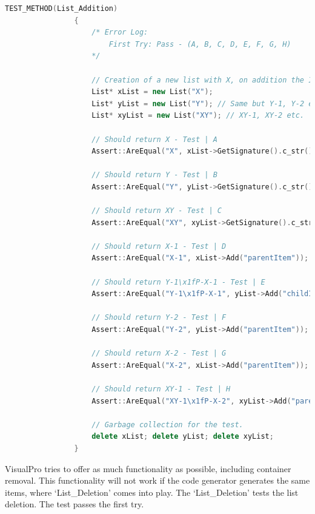 \documentclass[12pt]{report} %
\begin{document}
			\begin{lstlisting}[language=c++]
				TEST_METHOD(List_Addition)
				{
					/* Error Log:
						First Try: Pass - (A, B, C, D, E, F, G, H)
					*/

					// Creation of a new list with X, on addition the ID's should follow as X-1, X-2 etc.
					List* xList = new List("X");
					List* yList = new List("Y"); // Same but Y-1, Y-2 etc.
					List* xyList = new List("XY"); // XY-1, XY-2 etc.

					// Should return X - Test | A
					Assert::AreEqual("X", xList->GetSignature().c_str());

					// Should return Y - Test | B
					Assert::AreEqual("Y", yList->GetSignature().c_str());

					// Should return XY - Test | C
					Assert::AreEqual("XY", xyList->GetSignature().c_str());

					// Should return X-1 - Test | D
					Assert::AreEqual("X-1", xList->Add("parentItem"));

					// Should return Y-1\x1fP-X-1 - Test | E
					Assert::AreEqual("Y-1\x1fP-X-1", yList->Add("childItem", "X-1"));

					// Should return Y-2 - Test | F
					Assert::AreEqual("Y-2", yList->Add("parentItem"));

					// Should return X-2 - Test | G
					Assert::AreEqual("X-2", xList->Add("parentItem"));

					// Should return XY-1 - Test | H
					Assert::AreEqual("XY-1\x1fP-X-2", xyList->Add("parentItem", "X-2"));

					// Garbage collection for the test.
					delete xList; delete yList; delete xyList;
				}
			\end{lstlisting}

			VisualPro tries to offer as much functionality as possible, including container removal. This functionality will not work if the code generator generates the same items, where `List\_Deletion' comes into play. The `List\_Deletion' tests the list deletion. The test passes the first try.
\end{document}
